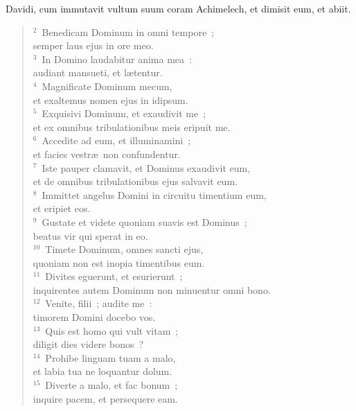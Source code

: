 \bchapter
\lettrine[lines=3,image=true,loversize=0.05,lraise=-0.03]{D}{}avidi, cum immutavit vultum suum coram Achimelech, et dimisit eum, et abiit.
\begin{flushleft}\begin{verse}\vspace{6pt}${}^{2}$~Benedicam Dominum in omni tempore~;\\ semper laus ejus in ore meo.\\
${}^{3}$~In Domino laudabitur anima mea~:\\ audiant mansueti, et l\ae tentur.\\
${}^{4}$~Magnificate Dominum mecum,\\ et exaltemus nomen ejus in idipsum.\\
${}^{5}$~Exquisivi Dominum, et exaudivit me~;\\ et ex omnibus tribulationibus meis eripuit me.\\
${}^{6}$~Accedite ad eum, et illuminamini~;\\ et facies vestr\ae\ non confundentur.\\
${}^{7}$~Iste pauper clamavit, et Dominus exaudivit eum,\\ et de omnibus tribulationibus ejus salvavit eum.\\
${}^{8}$~Immittet angelus Domini in circuitu timentium eum,\\ et eripiet eos.\\
${}^{9}$~Gustate et videte quoniam suavis est Dominus~;\\ beatus vir qui sperat in eo.\\
${}^{10}$~Timete Dominum, omnes sancti ejus,\\ quoniam non est inopia timentibus eum.\\
${}^{11}$~Divites eguerunt, et esurierunt~;\\ inquirentes autem Dominum non minuentur omni bono.\\
${}^{12}$~Venite, filii~; audite me~:\\ timorem Domini docebo vos.\\
${}^{13}$~Quis est homo qui vult vitam~;\\ diligit dies videre bonos~?\\
${}^{14}$~Prohibe linguam tuam a malo,\\ et labia tua ne loquantur dolum.\\
${}^{15}$~Diverte a malo, et fac bonum~;\\ inquire pacem, et persequere eam.\\

\end{verse}
\end{flushleft}
